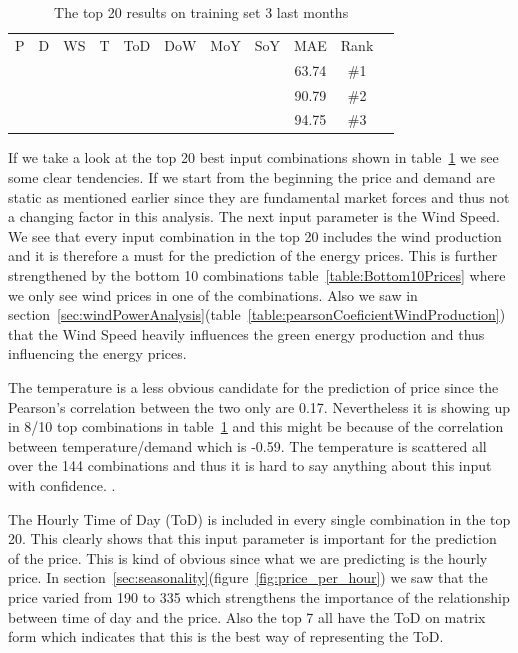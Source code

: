 \begin{table}[H]
\centering  %
\begin{tabular}{c c c c c c c c c c c} %
P & D & WS & T & ToD & DoW & MoY & SoY & MAE & Rank\\ [0.5ex] %
\x    & \x    & \x    & \x    & \x\m  & \x\m  &       & \x\m  & 63.74 & \#1 \\
\x    & \x    & \x    & \x    & \x\m  & \x\m  &       &       & 90.79 & \#2 \\
\x    & \x    & \x    & \x    & \x\m  & \x\m  & \x\m  &       & 94.75 & \#3 \\
\end{tabular}
\caption{The top 20 results on training set 3 last months} %
\label{table:Top20Prices} %
\end{table}

If we take a look at the top 20 best input combinations shown in table~\ref{table:Top20Prices} we see some clear tendencies. If we start from the beginning the price and demand are static as mentioned earlier since they are fundamental market forces and thus not a changing factor in this analysis. The next input parameter is the Wind Speed. We see that every input combination in the top 20 includes the wind production and it is therefore a must for the prediction of the energy prices. This is further strengthened by the bottom 10 combinations table~\ref{table:Bottom10Prices} where we only see wind prices in one of the combinations. Also we saw in section~\ref{sec:windPowerAnalysis}(table~\ref{table:pearsonCoeficientWindProduction}) that the Wind Speed heavily influences the green energy production and thus influencing the energy prices. 

The temperature is a less obvious candidate for the prediction of price since the Pearson's correlation between the two only are 0.17. Nevertheless it is showing up in 8/10 top combinations in table~\ref{table:Top20Prices} and this might be because of the correlation between temperature/demand which is -0.59. The temperature is scattered all over the 144 combinations and thus it is hard to say anything about this input with confidence. .

The Hourly Time of Day (ToD) is included in every single combination in the top 20. This clearly shows that this input parameter is important for the prediction of the price. This is kind of obvious since what we are predicting is the hourly price. In section~\ref{sec:seasonality}(figure~\ref{fig:price_per_hour}) we saw that the price varied from 190 to 335 which strengthens the importance of the relationship between time of day and the price. Also the top 7 all have the ToD on matrix form which indicates that this is the best way of representing the ToD.


